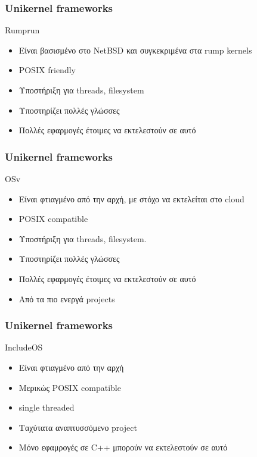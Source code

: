 \documentclass[red,slidestop,notes,compress,mathserif]{beamer}
\begin{document}
\begin{frame}
\frametitle{Unikernel frameworks}
	\begin{block}{Rumprun}
		\begin{itemize}
			\item Είναι βασισμένο στο NetBSD και συγκεκριμένα στα rump kernels 
			\item POSIX friendly
			\item Υποστήριξη για threads, filesystem
			\item Υποστηρίζει πολλές γλώσσες
			\item Πολλές εφαρμογές έτοιμες να εκτελεστούν σε αυτό
		\end{itemize}
	\end{block}
\end{frame}
\begin{frame}
\frametitle{Unikernel frameworks}
	\begin{block}{OSv}
		\begin{itemize}
			\item Είναι φτιαγμένο από την αρχή, με στόχο να εκτελείται στο cloud
			\item POSIX compatible
			\item Υποστήριξη για threads, filesystem.
			\item Υποστηρίζει πολλές γλώσσες
			\item Πολλές εφαρμογές έτοιμες να εκτελεστούν σε αυτό
			\item Από τα πιο ενεργά projects
		\end{itemize}
	\end{block}
\end{frame}
\begin{frame}
\frametitle{Unikernel frameworks}
	\begin{block}{IncludeOS}
		\begin{itemize}
			\item Είναι φτιαγμένο από την αρχή
			\item Μερικώς POSIX compatible
			\item single threaded
			\item Ταχύτατα αναπτυσσόμενο project
			\item Μόνο εφαμρογές σε C++ μπορούν να εκτελεστούν σε αυτό
		\end{itemize}
	\end{block}
\end{frame}
\end{document}
